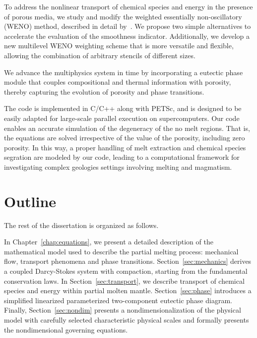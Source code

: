 \begin{description}
To address the nonlinear transport of chemical species and energy in the 
presence of porous media, we study and modify the weighted essentially 
non-oscillatory (WENO) method, described in detail by~\cite{Shu1998}.
We propose two simple alternatives to accelerate the evaluation of the 
smoothness indicator. Additionally, we develop a new multilevel WENO weighting 
scheme that is more versatile and flexible, allowing the combination of 
arbitrary stencils of different sizes.

We advance the multiphysics system in time by incorporating a eutectic phase module that
 couples compositional and thermal information with porosity, thereby capturing 
the evolution of porosity and phase transitions.

The code is implemented in C/C++ along with PETSc, 
and is designed to be easily adapted 
for large-scale parallel execution on supercomputers.
Our code enables an accurate simulation of the degeneracy of the no melt regions.
That is, the equations are solved irrespective of the value of the porosity,
including zero porosity.
In this way, a proper handling of melt extraction and chemical species segration are 
modeled by our code, leading to a computational framework for investigating 
complex geologies settings involving melting and magmatism.

\section{Outline}
The rest of the dissertation is organized as follows.

In Chapter~\ref{chap:equations}, we present a detailed description of the 
mathematical model used to describe 
the partial melting process: mechanical flow, transport phenomena and 
phase transitions.
Section~\ref{sec:mechanics} derives a coupled Darcy-Stokes system with 
compaction, starting from the fundamental 
conservation laws. In Section~\ref{sec:transport}, we describe transport of 
chemical species and energy
within partial molten mantle. Section~\ref{sec:phase} introduces a simplified 
linearized parameterized two-component 
eutectic phase diagram. Finally, Section~\ref{sec:nondim} presents a 
nondimensionalization of the physical model with carefully selected
characteristic physical scales and formally presents the nondimensional
governing equations.

\end{description}
